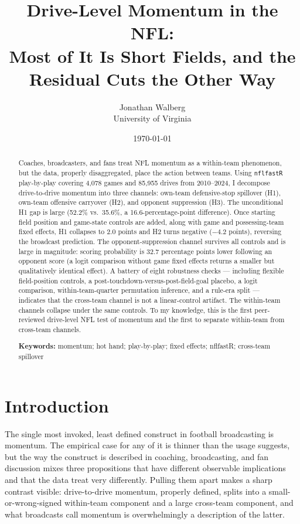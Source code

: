 \documentclass[11pt]{article}
\title{Drive-Level Momentum in the NFL: \\
       \large Most of It Is Short Fields, and the Residual Cuts the Other Way}
\author{Jonathan Walberg\\University of Virginia}
\date{\today}
\begin{document}
\maketitle

\begin{abstract}
\noindent Coaches, broadcasters, and fans treat NFL momentum as a within-team
phenomenon, but the data, properly disaggregated, place the action between
teams. Using \texttt{nflfastR} play-by-play covering 4{,}078 games and
85{,}955 drives from 2010--2024, I decompose drive-to-drive momentum into
three channels: own-team defensive-stop spillover (H1), own-team offensive
carryover (H2), and opponent suppression (H3). The unconditional H1 gap is
large (52.2\% vs.\ 35.6\%, a 16.6-percentage-point difference). Once starting
field position and game-state controls are added, along with game and
possessing-team fixed effects, H1 collapses to 2.0 points and H2 turns
negative ($-4.2$ points), reversing the broadcast prediction. The
opponent-suppression channel survives all controls and is large in magnitude:
scoring probability is 32.7 percentage points lower following an opponent
score (a logit comparison without game fixed effects returns a smaller but
qualitatively identical effect). A battery of eight robustness checks
--- including flexible field-position controls, a
post-touchdown-versus-post-field-goal placebo, a logit comparison,
within-team-quarter permutation inference, and a rule-era split ---
indicates that the cross-team channel is not a linear-control artifact.
The within-team channels collapse under the same controls. To my knowledge,
this is the first peer-reviewed drive-level NFL test of momentum and the
first to separate within-team from cross-team channels.

\medskip
\noindent\textbf{Keywords:} momentum; hot hand; play-by-play; fixed effects;
nflfastR; cross-team spillover
\end{abstract}

\section{Introduction}

The single most invoked, least defined construct in football broadcasting is
momentum. The empirical case for any of it is thinner than the usage suggests,
but the way the construct is described in coaching, broadcasting, and fan
discussion mixes three propositions that have different observable
implications and that the data treat very differently. Pulling them apart
makes a sharp contrast visible: drive-to-drive momentum, properly defined,
splits into a small-or-wrong-signed within-team component and a large cross-team
component, and what broadcasts call momentum is overwhelmingly a description
of the latter.
\end{document}

